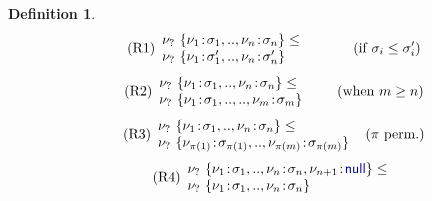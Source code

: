\documentclass[10pt,preprint,blind,clearpagebib]{sigplanconf}
\newcommand{\kvd}[1]{\textnormal{\textcolor{kvdclr}{\sffamily #1}}}
\newtheorem{definition}{Definition}
\begin{document}
\begin{definition}
\noindent
\begin{align}
\label{eq:sub-record1}\tag{R1}
\begin{array}{l}
 \nu_?~\{ \nu_1\!:\!\sigma_1, .., \nu_n\!:\!\sigma_n \} \leq \\
 \nu_?~\{ \nu_1\!:\!\sigma_1', .., \nu_n\!:\!\sigma_n' \}
\end{array} \qquad ~~~~(\textnormal{if}~\sigma_i \leq \sigma_i')
\end{align}
\vspace{-1em}
\begin{align}
\label{eq:sub-record2}\tag{R2}
\begin{array}{l}
 \nu_?~\{ \nu_1\!:\!\sigma_1, .., \nu_n\!:\!\sigma_n \} \leq \\
 \nu_?~\{ \nu_1\!:\!\sigma_1, .., .., \nu_m\!:\!\sigma_m \}
\end{array} \qquad (\textnormal{when}~m \geq n)
\end{align}
\vspace{-1em}
\begin{align}
\label{eq:sub-record3}\tag{R3}
\begin{array}{l}
 \nu_?~\{ \nu_1\!:\!\sigma_1, .., \nu_n\!:\!\sigma_n \} \leq \\
 \nu_?~\{ \nu_{\pi(1)}\!:\!\sigma_{\pi(1)}, .., \nu_{\pi(m)}\!:\!\sigma_{\pi(m)} \}
\end{array} ~~(\pi~\textnormal{perm.})
\end{align}
\vspace{-1em}
\begin{align}
\label{eq:sub-record4}\tag{R4}
\begin{array}{l}
 \nu_?~\{ \nu_1\!:\!\sigma_1, .., \nu_n\!:\!\sigma_n, \nu_{n+1}\!:\!\kvd{null} \} \leq \\
 \nu_?~\{ \nu_1\!:\!\sigma_1, .., \nu_n\!:\!\sigma_n \}
\end{array}
\end{align}
\end{definition}

\end{document}
